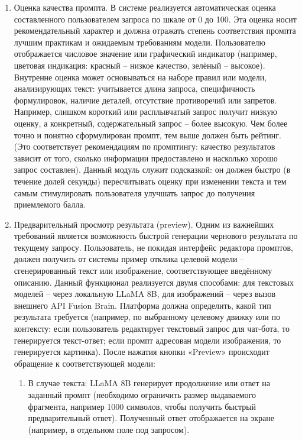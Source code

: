 \begin{enumerate}[label=\arabic*.]
    \item Оценка качества промпта. В системе реализуется автоматическая оценка составленного пользователем запроса по шкале от 0 до 100. Эта оценка носит рекомендательный характер и должна отражать степень соответствия промпта лучшим практикам и ожидаемым требованиям модели. Пользователю отображается числовое значение или графический индикатор (например, цветовая индикация: красный – низкое качество, зелёный – высокое). Внутренне оценка может основываться на наборе правил или модели, анализирующих текст: учитывается длина запроса, специфичность формулировок, наличие деталей, отсутствие противоречий или запретов. Например, слишком короткий или расплывчатый запрос получит низкую оценку, а конкретный, содержательный запрос – более высокую. Чем более точно и понятно сформулирован промпт, тем выше должен быть рейтинг. (Это соответствует рекомендациям по промптингу: качество результатов зависит от того, сколько информации предоставлено и насколько хорошо запрос составлен)\cite{promptingguide:basics}. Данный модуль служит подсказкой: он должен быстро (в течение долей секунды) пересчитывать оценку при изменении текста и тем самым стимулировать пользователя улучшать запрос до получения приемлемого балла.
    \item Предварительный просмотр результата (preview). Одним из важнейших требований является возможность быстрой генерации чернового результата по текущему запросу. Пользователь, не покидая интерфейс редактора промптов, должен получить от системы пример отклика целевой модели – сгенерированный текст или изображение, соответствующее введённому описанию. Данный функционал реализуется двумя способами: для текстовых моделей – через локальную LLaMA 8B, для изображений – через вызов внешнего API Fusion Brain. Платформа должна определить, какой тип результата требуется (например, по выбранному целевому движку или по контексту: если пользователь редактирует текстовый запрос для чат-бота, то генерируется текст-ответ; если промпт адресован модели изображения, то генерируется картинка). После нажатия кнопки «Preview» происходит обращение к соответствующей модели:
    \begin{enumerate}[label=4.\arabic*.]
        \item В случае текста: LLaMA 8B генерирует продолжение или ответ на заданный промпт (необходимо ограничить размер выдаваемого фрагмента, например 1000 символов, чтобы получить быстрый предварительный ответ). Полученный ответ отображается на экране (например, в отдельном поле под запросом).

\end{enumerate}
\end{enumerate}
